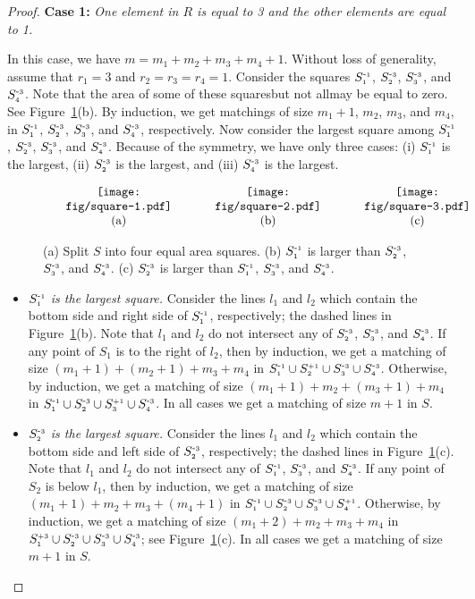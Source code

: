 \documentclass[11pt,a4paper]{article}
\newcommand{\SP}[2]{S^{\text{\tiny +#1}}_\text{\tiny #2}}
\newcommand{\SM}[2]{S^{\text{-\tiny #1}}_\text{\tiny #2}}
\begin{document}
\begin{proof}
{\bf Case 1:} {\em One element in $R$ is equal to 3 and the other elements are equal to 1.}

In this case, we have $m = m_1 + m_2 + m_3 + m_4 + 1$. Without loss of generality, assume that $r_1=3$ and $r_2=r_3=r_4=1$. Consider the squares $\SM{1}{1}$, $\SM{3}{2}$, $\SM{3}{3}$, and $\SM{3}{4}$. Note that the area of some of these squares\textemdash but not all\textemdash may be
equal to zero. See Figure~\ref{square-fig1}(b). By induction, we get matchings of size $m_1+1$, $m_2$, $m_3$, and $m_4$, in 
$\SM{1}{1}$, $\SM{3}{2}$, $\SM{3}{3}$, and $\SM{3}{4}$, respectively. Now consider the largest square among $\SM{1}{1}$, $\SM{3}{2}$, $\SM{3}{3}$, and $\SM{3}{4}$. Because of the symmetry, we have only three cases: (i) $\SM{1}{1}$ is the largest, (ii) $\SM{3}{2}$ is the largest, and (iii) $\SM{3}{4}$ is the largest.
\begin{figure}[htb]
  \centering
\setlength{\tabcolsep}{0in}
  $\begin{tabular}{ccc}
\multicolumn{1}{m{.33\columnwidth}}{\centering\texttt{[image: fig/square-1.pdf]}}
&\multicolumn{1}{m{.33\columnwidth}}{\centering\texttt{[image: fig/square-2.pdf]}} &\multicolumn{1}{m{.33\columnwidth}}{\centering\texttt{[image: fig/square-3.pdf]}}
\\
(a) & (b)& (c)
\end{tabular}$
  \caption{(a) Split $S$ into four equal area squares. (b) $\SM{1}{1}$ is larger than $\SM{3}{2}$, $\SM{3}{3}$, and $\SM{3}{4}$. (c) $\SM{3}{2}$ is larger than $\SM{1}{1}$, $\SM{3}{3}$, and $\SM{3}{4}$.}
\label{square-fig1}
\end{figure}
\begin{itemize}
\item {\em $\SM{1}{1}$ is the largest square.}
Consider the lines $l_1$ and $l_2$ which contain the bottom side and right side of $\SM{1}{1}$, respectively; the dashed lines in Figure~\ref{square-fig1}(b). Note that $l_1$ and $l_2$ do not intersect any of $\SM{3}{2}$, $\SM{3}{3}$, and $\SM{3}{4}$. If any point of $S_1$ is to the right of $l_2$, then by induction, we get a matching of size $(m_1+1)+(m_2+1)+m_3+m_4$ in $\SM{1}{1}\cup \SP{1}{2}\cup\SM{3}{3}\cup \SM{3}{4}$. Otherwise, by induction, we get a matching of size $(m_1+1)+m_2+(m_3+1)+ m_4$ in $\SM{1}{1}\cup \SM{3}{2}\cup\SP{1}{3}\cup \SM{3}{4}$. In all cases we get a matching of size $m+1$ in $S$. 
\item {\em $\SM{3}{2}$ is the largest square.}
Consider the lines $l_1$ and $l_2$ which contain the bottom side and left side of $\SM{3}{2}$, respectively; the dashed lines in Figure~\ref{square-fig1}(c). Note that $l_1$ and $l_2$ do not intersect any of $\SM{1}{1}$, $\SM{3}{3}$, and $\SM{3}{4}$. If any point of $S_2$ is below $l_1$, then by induction, we get a matching of size $(m_1+1)+m_2+m_3+(m_4+1)$ in $\SM{1}{1}\cup \SM{3}{2}\cup\SM{3}{3}\cup \SP{1}{4}$. Otherwise, by induction, we get a matching of size $(m_1+2)+m_2+m_3+ m_4$ in $\SP{3}{1}\cup \SM{3}{2}\cup\SM{3}{3}\cup \SM{3}{4}$; see Figure~\ref{square-fig1}(c). In all cases we get a matching of size $m+1$ in $S$. 


\end{itemize}
\end{proof}
\end{document}
